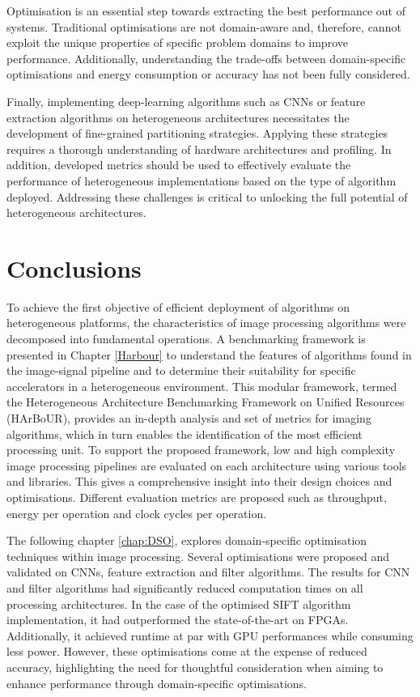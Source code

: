 Optimisation is an essential step towards extracting the best performance out of systems. Traditional optimisations are not domain-aware and, therefore, cannot exploit the unique properties of specific problem domains to improve performance. Additionally, understanding the trade-offs between domain-specific optimisations and energy consumption or accuracy has not been fully considered. 

Finally, implementing deep-learning algorithms such as CNNs or feature extraction algorithms on heterogeneous architectures necessitates the development of fine-grained partitioning strategies. Applying these strategies requires a thorough understanding of hardware architectures and profiling. In addition, developed metrics should be used to effectively evaluate the performance of heterogeneous implementations based on the type of algorithm deployed. Addressing these challenges is critical to unlocking the full potential of heterogeneous architectures.

\section{Conclusions}\label{sec:con_con}
To achieve the first objective of efficient deployment of algorithms on heterogeneous platforms, the characteristics of image processing algorithms were decomposed into fundamental operations. A benchmarking framework is presented in Chapter \ref{Harbour} to understand the features of algorithms found in the image-signal pipeline and to determine their suitability for specific accelerators in a heterogeneous environment. This modular framework, termed the Heterogeneous Architecture Benchmarking Framework on Unified Resources (HArBoUR), provides an in-depth analysis and set of metrics for imaging algorithms, which in turn enables the identification of the most efficient processing unit. To support the proposed framework, low and high complexity image processing pipelines are evaluated on each architecture using various tools and libraries. This gives a comprehensive insight into their design choices and optimisations. Different evaluation metrics are proposed such as throughput, energy per operation and clock cycles per operation.

The following chapter \ref{chap:DSO}, explores domain-specific optimisation techniques within image processing. Several optimisations were proposed and validated on CNNs, feature extraction and filter algorithms. The results for CNN and filter algorithms had significantly reduced computation times on all processing architectures. In the case of the optimised SIFT algorithm implementation, it had outperformed the state-of-the-art on FPGAs. Additionally, it achieved runtime at par with GPU performances while consuming less power. However, these optimisations come at the expense of reduced accuracy, highlighting the need for thoughtful consideration when aiming to enhance performance through domain-specific optimisations.

